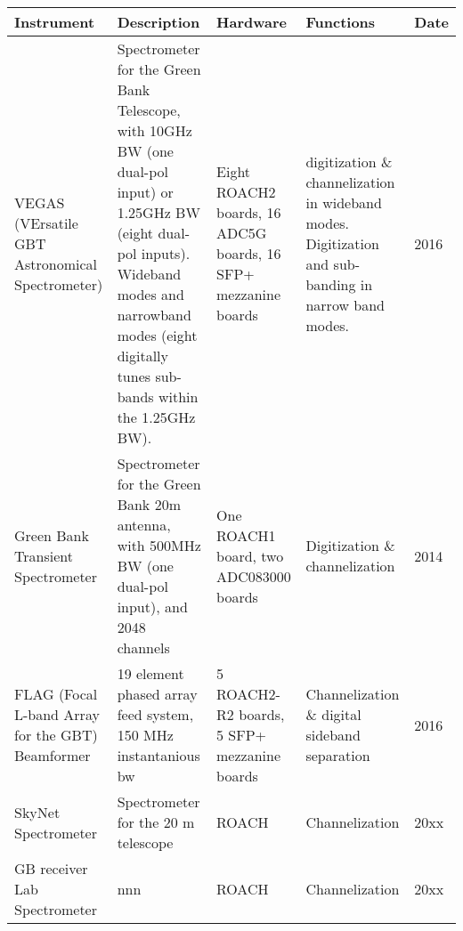 \documentclass{ws-jai}
\begin{document}
\begin{table}
\begin{center}
\begin{tabulary}{0.8\textwidth}{LLLLL}
\hline \hline
\textbf{Instrument}    &  \textbf{Description}   &  \textbf{Hardware}      & \textbf{Functions} & \textbf{Date}   \\

\hline
VEGAS (VErsatile GBT Astronomical Spectrometer)                &  
Spectrometer for the Green Bank Telescope, with 10GHz BW 
(one dual-pol input) or 1.25GHz BW (eight dual-pol inputs).  
Wideband modes and narrowband modes (eight digitally tunes 
sub-bands within the 1.25GHz BW).                              & 
Eight ROACH2 boards, 16 ADC5G boards, 16 SFP+ mezzanine boards & 
digitization \& channelization in wideband modes.  
Digitization and sub-banding in narrow band modes.             &
2016                                                           \\ 

\hline 
Green Bank Transient Spectrometer                              &
Spectrometer for the Green Bank 20m antenna, 
with 500MHz BW (one dual-pol input), and 2048 channels         &
One ROACH1 board, two ADC083000 boards                         &
Digitization \& channelization                                 &
2014                                                           \\

\hline 
FLAG (Focal L-band Array for the GBT) Beamformer               &
19 element phased array feed system, 150 MHz instantanious bw  & 
5 ROACH2-R2 boards, 5 SFP+ mezzanine boards                    & 
Channelization \& digital sideband separation                  &
2016                                                           \\

\hline 
SkyNet Spectrometer                                            &
Spectrometer for the 20 m telescope                            & 
ROACH                                                          & 
Channelization                                                 &
20xx                                                           \\

\hline 
GB receiver Lab Spectrometer                                   &
nnn                                                            & 
ROACH                                                          & 
Channelization                                                 &
20xx                                                           \\


\end{tabulary}
\end{center}
\end{table}
\end{document}
